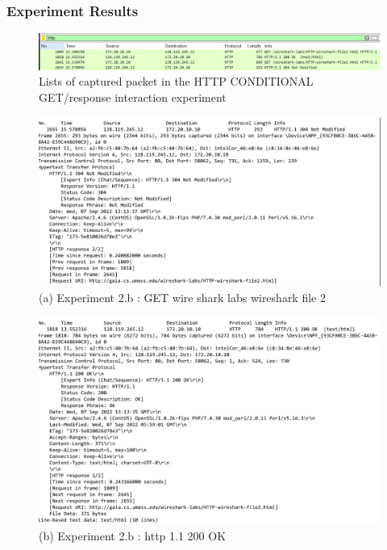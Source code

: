     \subsubsection*{Experiment Results}
    \begin{figure}[!h]\centering
		\includegraphics[width=.95\textwidth]{image/week01/2-4.png}
		\caption{\small Lists of captured packet in the HTTP CONDITIONAL GET/response interaction experiment}
	\end{figure}
    \vspace{-4mm}
        \begin{figure}[!h]\centering
    		\includegraphics[width=.9\textwidth]{image/week01/2-5.png}
    		\caption*{\small (a) Experiment 2.b : GET wire shark labs wireshark file 2}
        	\end{figure}
        \vspace{-4mm}
\clearpage
        \begin{figure}[!h]\centering
    		\includegraphics[width=.9\textwidth]{image/week01/2-6.png}
    		\caption*{\small (b) Experiment 2.b : http 1.1 200 OK}
        	\end{figure}
